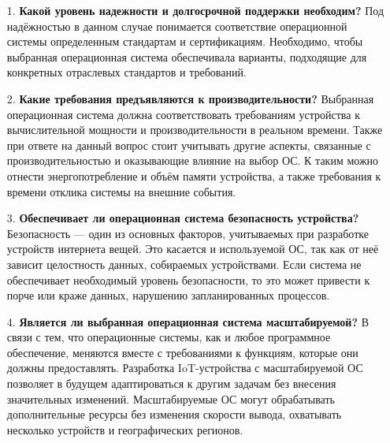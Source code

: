 

\begin{enumerate}
	\item[1.] \textbf{Какой уровень надежности и долгосрочной поддержки необходим?} \newline 
	Под надёжностью в данном случае понимается соответствие операционной системы определенным стандартам и сертификациям. Необходимо, чтобы выбранная операционная система обеспечивала варианты, подходящие для конкретных отраслевых стандартов и требований.
	\item[2.] \textbf{Какие требования предъявляются к производительности?} \newline 
	Выбранная операционная система должна соответствовать требованиям устройства к вычислительной мощности и производительности в реальном времени. Также при ответе на данный вопрос стоит учитывать другие аспекты, связанные с производительностью и оказывающие влияние на выбор ОС. К таким можно отнести энергопотребление и объём памяти устройства, а также требования к времени отклика системы на внешние события.
	\item[3.] \textbf{Обеспечивает ли операционная система безопасность устройства?} \newline 
	Безопасность --- один из основных факторов, учитываемых при разработке устройств интернета вещей. Это касается и используемой ОС, так как от неё зависит целостность данных, собираемых устройствами. Если система не обеспечивает необходимый уровень безопасности, то это может привести к порче или краже данных, нарушению запланированных процессов.
	\item[4.] \textbf{Является ли выбранная операционная система масштабируемой?} \newline 
	В связи с тем, что операционные системы, как и любое программное обеспечение, меняются вместе с требованиями к функциям, которые они должны предоставлять. Разработка IoT-устройства с масштабируемой ОС позволяет в будущем адаптироваться к другим задачам без внесения значительных изменений. Масштабируемые ОС могут обрабатывать дополнительные ресурсы без изменения скорости вывода, охватывать несколько устройств и географических регионов.
\end{enumerate}






